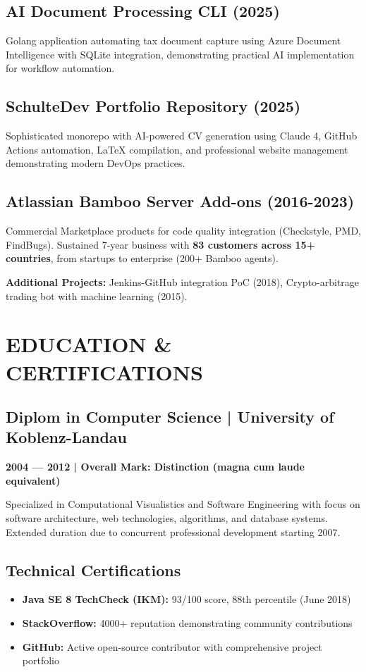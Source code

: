 \documentclass[11pt,a4paper]{article}
\begin{document}
\subsection{AI Document Processing CLI (2025)}
Golang application automating tax document capture using Azure Document Intelligence with SQLite integration, demonstrating practical AI implementation for workflow automation.

\subsection{SchulteDev Portfolio Repository (2025)}
Sophisticated monorepo with AI-powered CV generation using Claude 4, GitHub Actions automation, LaTeX compilation, and professional website management demonstrating modern DevOps practices.

\subsection{Atlassian Bamboo Server Add-ons (2016-2023)}
Commercial Marketplace products for code quality integration (Checkstyle, PMD, FindBugs). Sustained 7-year business with \textbf{83 customers across 15+ countries}, from startups to enterprise (200+ Bamboo agents).

\vspace{6pt}
\textbf{Additional Projects:} Jenkins-GitHub integration PoC (2018), Crypto-arbitrage trading bot with machine learning (2015).

\vfill

\newpage

\section{EDUCATION \& CERTIFICATIONS}

\subsection{Diplom in Computer Science | University of Koblenz-Landau}
\textbf{2004 --- 2012 | Overall Mark: Distinction (magna cum laude equivalent)}

Specialized in Computational Visualistics and Software Engineering with focus on software architecture, web technologies, algorithms, and database systems. Extended duration due to concurrent professional development starting 2007.

\subsection{Technical Certifications}
\begin{itemize}
\item \textbf{Java SE 8 TechCheck (IKM):} 93/100 score, 88th percentile (June 2018)
\item \textbf{StackOverflow:} 4000+ reputation demonstrating community contributions
\item \textbf{GitHub:} Active open-source contributor with comprehensive project portfolio
\end{itemize}
\end{document}
